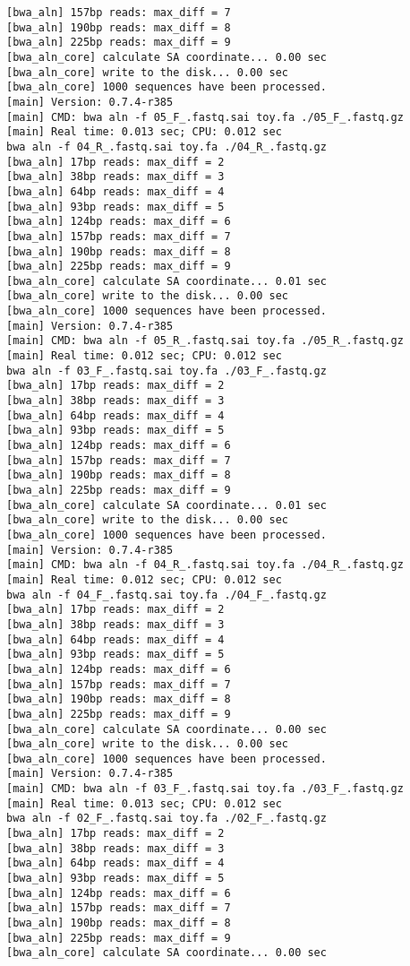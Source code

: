 \documentclass{article}
\begin{document}
\begin{lstlisting}
[bwa_aln] 157bp reads: max_diff = 7
[bwa_aln] 190bp reads: max_diff = 8
[bwa_aln] 225bp reads: max_diff = 9
[bwa_aln_core] calculate SA coordinate... 0.00 sec
[bwa_aln_core] write to the disk... 0.00 sec
[bwa_aln_core] 1000 sequences have been processed.
[main] Version: 0.7.4-r385
[main] CMD: bwa aln -f 05_F_.fastq.sai toy.fa ./05_F_.fastq.gz
[main] Real time: 0.013 sec; CPU: 0.012 sec
bwa aln -f 04_R_.fastq.sai toy.fa ./04_R_.fastq.gz
[bwa_aln] 17bp reads: max_diff = 2
[bwa_aln] 38bp reads: max_diff = 3
[bwa_aln] 64bp reads: max_diff = 4
[bwa_aln] 93bp reads: max_diff = 5
[bwa_aln] 124bp reads: max_diff = 6
[bwa_aln] 157bp reads: max_diff = 7
[bwa_aln] 190bp reads: max_diff = 8
[bwa_aln] 225bp reads: max_diff = 9
[bwa_aln_core] calculate SA coordinate... 0.01 sec
[bwa_aln_core] write to the disk... 0.00 sec
[bwa_aln_core] 1000 sequences have been processed.
[main] Version: 0.7.4-r385
[main] CMD: bwa aln -f 05_R_.fastq.sai toy.fa ./05_R_.fastq.gz
[main] Real time: 0.012 sec; CPU: 0.012 sec
bwa aln -f 03_F_.fastq.sai toy.fa ./03_F_.fastq.gz
[bwa_aln] 17bp reads: max_diff = 2
[bwa_aln] 38bp reads: max_diff = 3
[bwa_aln] 64bp reads: max_diff = 4
[bwa_aln] 93bp reads: max_diff = 5
[bwa_aln] 124bp reads: max_diff = 6
[bwa_aln] 157bp reads: max_diff = 7
[bwa_aln] 190bp reads: max_diff = 8
[bwa_aln] 225bp reads: max_diff = 9
[bwa_aln_core] calculate SA coordinate... 0.01 sec
[bwa_aln_core] write to the disk... 0.00 sec
[bwa_aln_core] 1000 sequences have been processed.
[main] Version: 0.7.4-r385
[main] CMD: bwa aln -f 04_R_.fastq.sai toy.fa ./04_R_.fastq.gz
[main] Real time: 0.012 sec; CPU: 0.012 sec
bwa aln -f 04_F_.fastq.sai toy.fa ./04_F_.fastq.gz
[bwa_aln] 17bp reads: max_diff = 2
[bwa_aln] 38bp reads: max_diff = 3
[bwa_aln] 64bp reads: max_diff = 4
[bwa_aln] 93bp reads: max_diff = 5
[bwa_aln] 124bp reads: max_diff = 6
[bwa_aln] 157bp reads: max_diff = 7
[bwa_aln] 190bp reads: max_diff = 8
[bwa_aln] 225bp reads: max_diff = 9
[bwa_aln_core] calculate SA coordinate... 0.00 sec
[bwa_aln_core] write to the disk... 0.00 sec
[bwa_aln_core] 1000 sequences have been processed.
[main] Version: 0.7.4-r385
[main] CMD: bwa aln -f 03_F_.fastq.sai toy.fa ./03_F_.fastq.gz
[main] Real time: 0.013 sec; CPU: 0.012 sec
bwa aln -f 02_F_.fastq.sai toy.fa ./02_F_.fastq.gz
[bwa_aln] 17bp reads: max_diff = 2
[bwa_aln] 38bp reads: max_diff = 3
[bwa_aln] 64bp reads: max_diff = 4
[bwa_aln] 93bp reads: max_diff = 5
[bwa_aln] 124bp reads: max_diff = 6
[bwa_aln] 157bp reads: max_diff = 7
[bwa_aln] 190bp reads: max_diff = 8
[bwa_aln] 225bp reads: max_diff = 9
[bwa_aln_core] calculate SA coordinate... 0.00 sec

\end{lstlisting}
\end{document}
